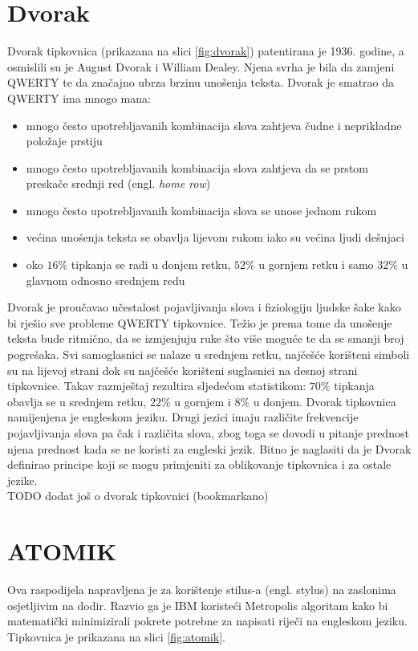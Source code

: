 \documentclass[times, utf8, zavrsni]{fer}
\begin{document}
\section{Dvorak}
Dvorak tipkovnica (prikazana na slici \ref{fig:dvorak}) patentirana je 1936. godine, a osmislili su je August Dvorak i William Dealey. Njena svrha je bila da zamjeni QWERTY te da značajno ubrza brzinu unošenja teksta. Dvorak je smatrao da QWERTY ima mnogo mana:

\begin{itemize}
\item mnogo često upotrebljavanih kombinacija slova zahtjeva čudne i neprikladne položaje prstiju
\item mnogo često upotrebljavanih kombinacija slova zahtjeva da se prstom preskače srednji red (engl. \emph{home row})
\item mnogo često upotrebljavanih kombinacija slova se unose jednom rukom
\item većina unošenja teksta se obavlja lijevom rukom iako su većina ljudi dešnjaci
\item oko $16\%$ tipkanja se radi u donjem retku, $52\%$ u gornjem retku i samo $32\%$ u glavnom odnosno srednjem redu
\end{itemize}

Dvorak je proučavao učestalost pojavljivanja slova i fiziologiju ljudske šake kako bi rješio sve probleme QWERTY tipkovnice. Težio je prema tome da unošenje teksta bude ritmično, da se izmjenjuju ruke što više moguće te da se smanji broj pogrešaka. Svi samoglasnici se nalaze u srednjem retku, najčešće korišteni simboli su na lijevoj strani dok su najčešće korišteni suglasnici na desnoj strani tipkovnice. Takav razmještaj rezultira sljedećom statistikom: $70\%$ tipkanja obavlja se u srednjem retku, $22\%$ u gornjem i $8\%$ u donjem.  Dvorak tipkovnica namijenjena je engleskom jeziku. Drugi jezici imaju različite frekvencije pojavljivanja slova pa čak i različita slova, zbog toga se dovodi u pitanje prednost njena prednost kada se ne koristi za engleski jezik. Bitno je naglasiti da je Dvorak definirao principe koji se mogu primjeniti za oblikovanje tipkovnica i za ostale jezike.
\\TODO dodat još o dvorak tipkovnici (bookmarkano)

\section{ATOMIK}
Ova raspodijela napravljena je za korištenje stilus-a (engl. stylus) na zaslonima osjetljivim na dodir. Razvio ga je IBM koristeći Metropolis algoritam kako bi matematički minimizirali pokrete potrebne za napisati riječi na engleskom jeziku. Tipkovnica je prikazana na slici \ref{fig:atomik}.
\end{document}
